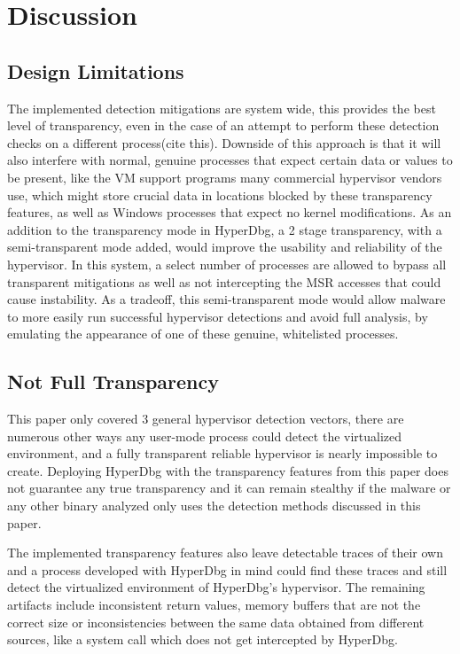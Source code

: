 \section{Discussion}\label{s:discussion}


\subsection{Design Limitations}
The implemented detection mitigations are system wide, this provides the best level of transparency, even in the case of an attempt 
to perform these detection checks on a different process(cite this). Downside of this approach is that it will also interfere with normal, 
genuine processes that expect certain data or values to be present, like the VM support programs many commercial hypervisor vendors use, 
which might store crucial data in locations blocked by these transparency features, as well as Windows processes that expect no kernel modifications. 
As an addition to the transparency mode in HyperDbg, a 2 stage transparency, with a semi-transparent mode added, would improve the usability and reliability of the hypervisor. 
In this system, a select number of processes are allowed to bypass all transparent mitigations as well as not intercepting the MSR accesses that could cause instability. 
As a tradeoff, this semi-transparent mode would allow malware to more easily run successful hypervisor detections and avoid full analysis, by emulating the appearance of one 
of these genuine, whitelisted processes.

\subsection{Not Full Transparency}
This paper only covered 3 general hypervisor detection vectors, there are numerous other ways any user-mode process could detect the virtualized environment, 
and a fully transparent reliable hypervisor is nearly impossible to create. Deploying HyperDbg with the transparency features from this paper does not guarantee any true 
transparency and it can remain stealthy if the malware or any other binary analyzed only uses the detection methods discussed in this paper.

The implemented transparency features also leave detectable traces of their own and a process developed with HyperDbg in mind could find these 
traces and still detect the virtualized environment of HyperDbg’s hypervisor. The remaining artifacts include inconsistent return values, memory buffers 
that are not the correct size or inconsistencies between the same data obtained from different sources, like a system call which does not get intercepted by HyperDbg.



